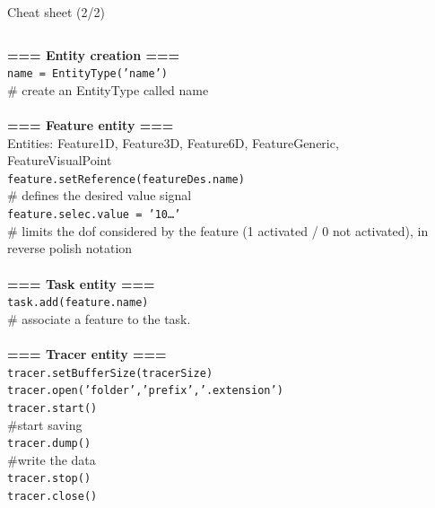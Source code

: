 \begin{frame} {Cheat sheet (2/2)}
 \begin{columns}
  \begin{column}[t]{5cm}
{\tiny
\textbf{=== Entity creation ===}\\
\texttt{name = EntityType('name')}\\
\# create an EntityType called name\\
~\\
\textbf{=== Feature entity ===}\\
Entities: Feature1D, Feature3D, Feature6D, FeatureGeneric, FeatureVisualPoint\\
\texttt{feature.setReference(featureDes.name)}\\
\# defines the desired value signal\\
\texttt{feature.selec.value = '10…'}\\
\# limits the dof considered by the feature (1 activated / 0 not activated),
in reverse polish notation\\
~\\

\textbf{=== Task entity ===}\\
\texttt{task.add(feature.name)}\\
\# associate a feature to the task.\\
~\\
\textbf{=== Tracer entity ===}\\
\texttt{tracer.setBufferSize(tracerSize) }\\
\texttt{tracer.open('folder','prefix','.extension') }\\
\texttt{tracer.start() }\\
\#start saving \\
\texttt{tracer.dump()} \\
\#write the data\\
\texttt{tracer.stop() }\\
\texttt{tracer.close()}\\
}
  \end{column}
  \begin{column}[t]{5cm}
  \end{column}
 \end{columns}
\end{frame}

